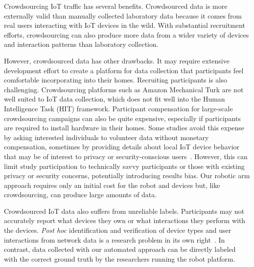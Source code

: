 Crowdsourcing IoT traffic has several benefits. Crowdsourced data is more externally valid than manually collected laboratory data because it comes from real users interacting with IoT devices in the wild. 
With substantial recruitment efforts, crowdsourcing can also produce more data from a wider variety of devices and interaction patterns than laboratory collection. 

However, crowdsourced data has other drawbacks. It may require extensive development effort to create a platform for data collection that participants feel comfortable incorporating into their homes. Recruiting participants is also challenging. Crowdsourcing platforms such as Amazon Mechanical Turk are not well suited to IoT data collection, which does not fit well into the Human Intelligence Task (HIT) framework.
Participant compensation for large-scale crowdsourcing campaigns can also be quite expensive, especially if participants are required to install hardware in their homes. 
Some studies avoid this expense by asking interested individuals to volunteer data without monetary compensation, sometimes by providing details about local IoT device behavior that may be of interest to privacy or security-conscious users~\cite{huang2020iot}. However, this can limit study participation to technically savvy participants or those with existing privacy or security concerns, potentially introducing results bias. Our robotic arm approach requires only an initial cost for the robot and devices but, like crowdsourcing, can produce large amounts of data.

Crowdsourced IoT data also suffers from unreliable labels. Participants may not accurately report what devices they own or what interactions they perform with the devices. \textit{Post hoc} identification and verification of device types and user interactions from network data is a research problem in its own right~\cite{huang2020iot}.
In contrast, data collected with our automated approach can be directly labeled with the correct ground truth by the researchers running the robot platform.


